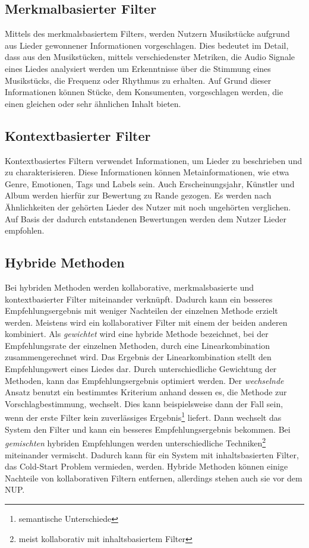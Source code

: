 \documentclass[twosided,a4,10pt]{article}
\begin{document}
\begin{multicols}{2}
		\subsection{Merkmalbasierter Filter}
		Mittels des merkmalsbasiertem Filters, werden Nutzern Musikstücke aufgrund aus Lieder gewonnener Informationen vorgeschlagen. Dies bedeutet im Detail, dass aus den Musikstücken, mittels verschiedenster Metriken, die Audio Signale eines Liedes analysiert werden um Erkenntnisse über die Stimmung eines Musikstücks, die Frequenz oder Rhythmus zu erhalten. Auf Grund dieser Informationen können Stücke, dem Konsumenten, vorgeschlagen werden, die einen gleichen oder sehr ähnlichen Inhalt bieten. \cite{kaitila}
		\subsection{Kontextbasierter Filter}
		Kontextbasiertes Filtern verwendet Informationen, um Lieder zu beschrieben und zu charakterisieren. Diese Informationen können Metainformationen, wie etwa Genre, Emotionen, Tags und Labels sein. Auch Erscheinungsjahr, Künstler und Album werden hierfür zur Bewertung zu Rande gezogen. Es werden nach Ähnlichkeiten der gehörten Lieder des Nutzer mit noch ungehörten verglichen. Auf Basis der dadurch entstandenen Bewertungen werden dem Nutzer Lieder empfohlen. \cite{kaitila}			
		\subsection{Hybride Methoden}
		Bei hybriden Methoden werden kollaborative, merkmalsbasierte und kontextbasierter Filter miteinander verknüpft. Dadurch kann ein besseres Empfehlungsergebnis mit weniger Nachteilen der einzelnen Methode erzielt werden. Meistens wird ein kollaborativer Filter mit einem der beiden anderen kombiniert.\newline
		Als \textit{gewichtet} wird eine hybride Methode bezeichnet, bei der Empfehlungsrate der einzelnen Methoden, durch eine Linearkombination zusammengerechnet wird. Das Ergebnis der Linearkombination stellt den Empfehlungswert eines Liedes dar. Durch unterschiedliche Gewichtung der Methoden, kann das Empfehlungsergebnis optimiert werden. Der \textit{wechselnde} Ansatz benutzt ein bestimmtes Kriterium anhand dessen es, die Methode zur Vorschlagbestimmung, wechselt. Dies kann beispielsweise dann der Fall sein, wenn der erste Filter kein zuverlässiges Ergebnis\footnote[6]{semantische Unterschiede} liefert. Dann wechselt das System den Filter und kann ein besseres Empfehlungsergebnis bekommen. Bei \textit{gemischten} hybriden Empfehlungen werden unterschiedliche Techniken\footnote[7]{meist kollaborativ mit inhaltsbasiertem Filter} miteinander vermischt. Dadurch kann für ein System mit inhaltsbasierten Filter, das Cold-Start Problem vermieden, werden.\newline
		Hybride Methoden können einige Nachteile von kollaborativen Filtern entfernen, allerdings stehen auch sie vor dem NUP. \cite{burke}

\end{multicols}
\end{document}
